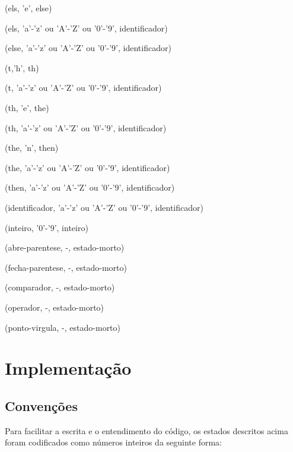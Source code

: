 \documentclass[12pt,a4paper,twoside]{report}
\begin{document}
(els, 'e', else)

(els, 'a'-'z' ou 'A'-'Z' ou '0'-'9', identificador)

(else, 'a'-'z' ou 'A'-'Z' ou '0'-'9', identificador)

(t,'h', th)

(t, 'a'-'z' ou 'A'-'Z' ou '0'-'9', identificador)

(th, 'e', the)

(th, 'a'-'z' ou 'A'-'Z' ou '0'-'9', identificador)

(the, 'n', then)

(the, 'a'-'z' ou 'A'-'Z' ou '0'-'9', identificador)

(then, 'a'-'z' ou 'A'-'Z' ou '0'-'9', identificador)

(identificador, 'a'-'z' ou 'A'-'Z' ou '0'-'9', identificador)

(inteiro, '0'-'9', inteiro)

(abre-parentese, -, estado-morto)

(fecha-parentese, -, estado-morto)

(comparador, -, estado-morto)

(operador, -, estado-morto)

(ponto-virgula, -, estado-morto)

\section{Implementação}
\subsection{Convenções}
Para facilitar a escrita e o entendimento do código, os estados descritos acima foram codificados como números inteiros da seguinte forma:
\end{document}
